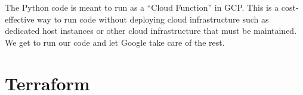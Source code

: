 \justifying
The Python code is meant to run as a ``Cloud Function'' in GCP. This is a cost-effective way to run code without deploying cloud infrastructure such as dedicated host instances or other cloud infrastructure that must be maintained. We get to run our code and let Google take care of the rest.

\section{\label{sec:Terraform}Terraform}


\clearpage
\begin{versionhistory}
\end{versionhistory}

\clearpage




